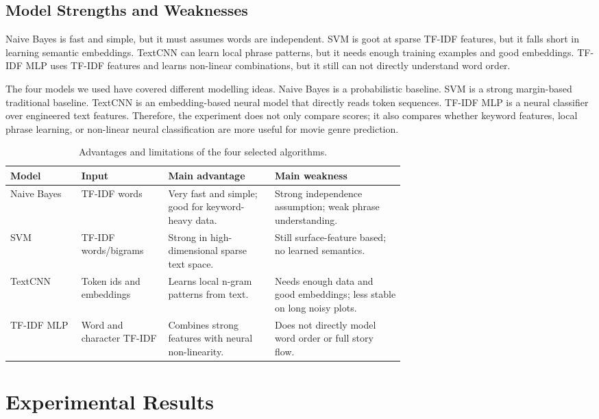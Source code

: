 \documentclass[12pt,a4paper]{article}
\begin{document}
\subsection{Model Strengths and Weaknesses}
Naive Bayes is fast and simple, but it must assumes words are independent. SVM is goot at sparse TF-IDF features, but it falls short in learning semantic embeddings. TextCNN can learn local phrase patterns, but it needs enough training examples and good embeddings. TF-IDF MLP uses TF-IDF features and learns non-linear combinations, but it still can not directly understand word order.

The four models we used have covered different modelling ideas. Naive Bayes is a probabilistic baseline. SVM is a strong margin-based traditional baseline. TextCNN is an embedding-based neural model that directly reads token sequences. TF-IDF MLP is a neural classifier over engineered text features. Therefore, the experiment does not only compare scores; it also compares whether keyword features, local phrase learning, or non-linear neural classification are more useful for movie genre prediction.

\begin{table}[H]
\centering
\begin{tabularx}{\linewidth}{p{0.18\linewidth}p{0.22\linewidth}p{0.27\linewidth}X}
\toprule
\textbf{Model} & \textbf{Input} & \textbf{Main advantage} & \textbf{Main weakness} \\
\midrule
Naive Bayes & TF-IDF words & Very fast and simple; good for keyword-heavy data. & Strong independence assumption; weak phrase understanding. \\
SVM & TF-IDF words/bigrams & Strong in high-dimensional sparse text space. & Still surface-feature based; no learned semantics. \\
TextCNN & Token ids and embeddings & Learns local n-gram patterns from text. & Needs enough data and good embeddings; less stable on long noisy plots. \\
TF-IDF MLP & Word and character TF-IDF & Combines strong features with neural non-linearity. & Does not directly model word order or full story flow. \\
\bottomrule
\end{tabularx}
\caption{Advantages and limitations of the four selected algorithms.}
\label{tab:model_strengths}
\end{table}

\section{Experimental Results}
\end{document}
